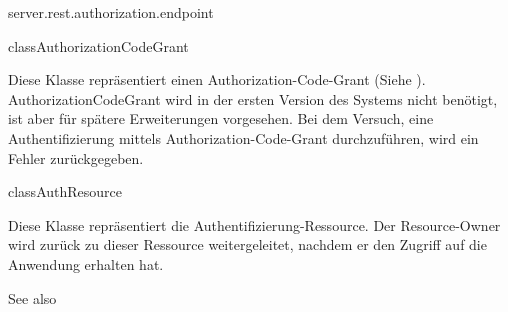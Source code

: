 \begin{texdocpackage}{server.rest.authorization.endpoint}
\label{texdoclet:edu.kit.informatik.studyplan.server.rest.authorization.endpoint}

\begin{texdocclass}{class}{AuthorizationCodeGrant}
\label{texdoclet:edu.kit.informatik.studyplan.server.rest.authorization.endpoint.AuthorizationCodeGrant}
\begin{texdocclassintro}
Diese Klasse repräsentiert einen Authorization-Code-Grant (Siehe \cite[Kap.~1.3.1]{rfc6749}).
 AuthorizationCodeGrant wird in der ersten Version des Systems nicht benötigt, ist aber für spätere
 Erweiterungen vorgesehen.
 Bei dem Versuch, eine Authentifizierung mittels Authorization-Code-Grant durchzuführen, wird ein Fehler
 zurückgegeben.\end{texdocclassintro}
\begin{texdocclassconstructors}
\end{texdocclassconstructors}
\begin{texdocclassmethods}
\end{texdocclassmethods}
\end{texdocclass}


\begin{texdocclass}{class}{AuthResource}
\label{texdoclet:edu.kit.informatik.studyplan.server.rest.authorization.endpoint.AuthResource}
\begin{texdocclassintro}
Diese Klasse repräsentiert die Authentifizierung-Ressource.
 Der Resource-Owner wird zurück zu dieser Ressource weitergeleitet, nachdem er 
 den Zugriff auf die Anwendung erhalten hat.\end{texdocclassintro}
\begin{texdocclassconstructors}
\end{texdocclassconstructors}
\begin{texdocclassmethods}
\begin{texdocsees}{See also}
\end{texdocsees}


\end{texdocclassmethods}
\end{texdocclass}
\end{texdocpackage}
